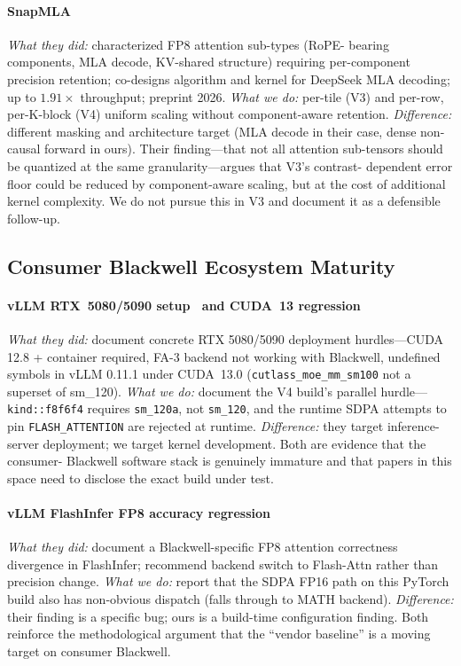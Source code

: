 \documentclass[conference]{IEEEtran}
\begin{document}
\paragraph*{SnapMLA~\cite{zhang2026snapmla}}
\emph{What they did:} characterized FP8 attention sub-types (RoPE-
bearing components, MLA decode, KV-shared structure) requiring
per-component precision retention; co-designs algorithm and kernel
for DeepSeek MLA decoding; up to $1.91\times$ throughput; preprint
2026. \emph{What we do:} per-tile (V3) and per-row, per-K-block
(V4) uniform scaling without component-aware retention.
\emph{Difference:} different masking and architecture target
(MLA decode in their case, dense non-causal forward in ours).
Their finding---that not all attention sub-tensors should be
quantized at the same granularity---argues that V3's contrast-
dependent error floor could be reduced by component-aware scaling,
but at the cost of additional kernel complexity. We do not pursue
this in V3 and document it as a defensible follow-up.

\subsection{Consumer Blackwell Ecosystem Maturity}

\paragraph*{vLLM RTX~5080/5090 setup~\cite{vllm2025issue14452} and CUDA~13 regression~\cite{vllm2025issue29030}}
\emph{What they did:} document concrete RTX 5080/5090 deployment
hurdles---CUDA 12.8 + container required, FA-3 backend not
working with Blackwell, undefined symbols in vLLM 0.11.1 under
CUDA~13.0 (\texttt{cutlass\_moe\_mm\_sm100} not a superset of
sm\_120). \emph{What we do:} document the V4 build's parallel
hurdle---\texttt{kind::f8f6f4} requires \texttt{sm\_120a}, not
\texttt{sm\_120}, and the runtime SDPA attempts to pin
\texttt{FLASH\_ATTENTION} are rejected at runtime.
\emph{Difference:} they target inference-server deployment; we
target kernel development. Both are evidence that the consumer-
Blackwell software stack is genuinely immature and that papers
in this space need to disclose the exact build under test.

\paragraph*{vLLM FlashInfer FP8 accuracy regression~\cite{vllm2026issue35138}}
\emph{What they did:} document a Blackwell-specific FP8 attention
correctness divergence in FlashInfer; recommend backend switch to
Flash-Attn rather than precision change. \emph{What we do:}
report that the SDPA FP16 path on this PyTorch build also has
non-obvious dispatch (falls through to MATH backend).
\emph{Difference:} their finding is a specific bug; ours is a
build-time configuration finding. Both reinforce the
methodological argument that the ``vendor baseline'' is a moving
target on consumer Blackwell.
\end{document}
